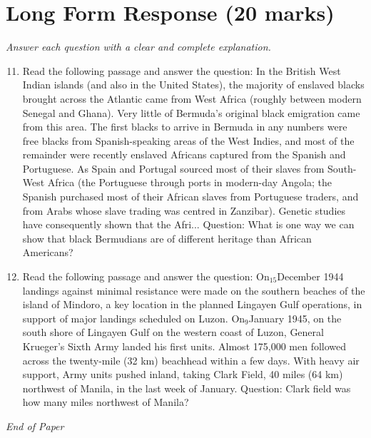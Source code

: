 \documentclass[12pt]{article}
\begin{document}
\section*{Long Form Response (20 marks)}
\textit{Answer each question with a clear and complete explanation.}
\begin{enumerate}[label=\arabic*.]
\setcounter{enumi}{10}
\item Read the following passage and answer the question: In the British West Indian islands (and also in the United States), the majority of enslaved blacks brought across the Atlantic came from West Africa (roughly between modern Senegal and Ghana). Very little of Bermuda's original black emigration came from this area. The first blacks to arrive in Bermuda in any numbers were free blacks from Spanish-speaking areas of the West Indies, and most of the remainder were recently enslaved Africans captured from the Spanish and Portuguese. As Spain and Portugal sourced most of their slaves from South-West Africa (the Portuguese through ports in modern-day Angola; the Spanish purchased most of their African slaves from Portuguese traders, and from Arabs whose slave trading was centred in Zanzibar). Genetic studies have consequently shown that the Afri... Question: What is one way we can show that black Bermudians are of different heritage than African Americans?
\item Read the following passage and answer the question: On$_{15}$December 1944 landings against minimal resistance were made on the southern beaches of the island of Mindoro, a key location in the planned Lingayen Gulf operations, in support of major landings scheduled on Luzon. On$_{9}$January 1945, on the south shore of Lingayen Gulf on the western coast of Luzon, General Krueger's Sixth Army landed his first units. Almost 175,000 men followed across the twenty-mile (32 km) beachhead within a few days. With heavy air support, Army units pushed inland, taking Clark Field, 40 miles (64 km) northwest of Manila, in the last week of January. Question: Clark field was how many miles northwest of Manila?
\end{enumerate}

\vfill
\noindent\textit{End of Paper}
\end{document}
